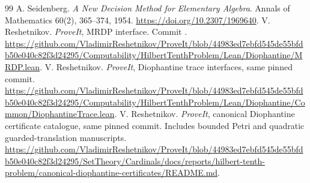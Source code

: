 \documentclass[11pt,letterpaper]{article}
\theoremstyle{definition}
\theoremstyle{remark}
\begin{document}
\begin{thebibliography}{99}
 A. Seidenberg. \emph{A New Decision Method for Elementary Algebra}. Annals of Mathematics 60(2), 365--374, 1954. \url{https://doi.org/10.2307/1969640}.
 V. Reshetnikov. \emph{ProveIt}, MRDP interface. Commit . \url{https://github.com/VladimirReshetnikov/ProveIt/blob/44983ed7ebfd545de55bfdb50e040c82f3d24295/Computability/HilbertTenthProblem/Lean/Diophantine/MRDP.lean}.
 V. Reshetnikov. \emph{ProveIt}, Diophantine trace interfaces, same pinned commit. \url{https://github.com/VladimirReshetnikov/ProveIt/blob/44983ed7ebfd545de55bfdb50e040c82f3d24295/Computability/HilbertTenthProblem/Lean/Diophantine/Common/DiophantineTrace.lean}.
 V. Reshetnikov. \emph{ProveIt}, canonical Diophantine certificate catalogue, same pinned commit. Includes bounded Petri and quadratic guarded-translation manuscripts. \url{https://github.com/VladimirReshetnikov/ProveIt/blob/44983ed7ebfd545de55bfdb50e040c82f3d24295/SetTheory/Cardinals/docs/reports/hilbert-tenth-problem/canonical-diophantine-certificates/README.md}.

\end{thebibliography}
\end{document}
